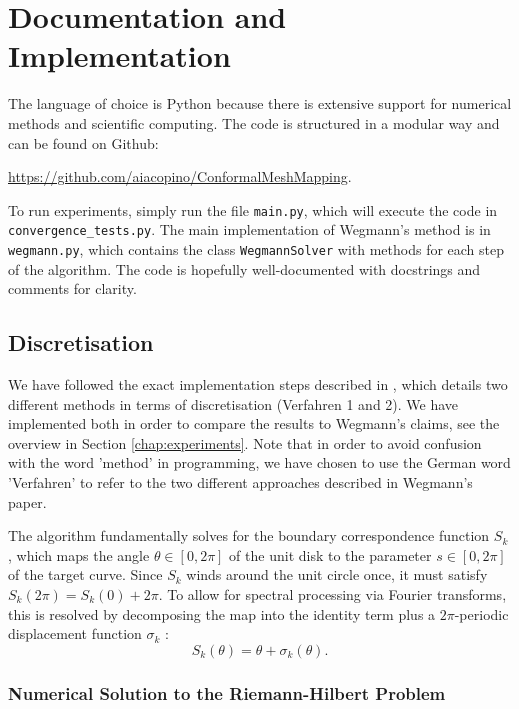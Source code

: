 \section{Documentation and Implementation} \label{chap:implementation}

The language of choice is Python because there is extensive support for numerical methods and scientific computing. The code is structured in a modular way and can be found on Github: 

\url{https://github.com/aiacopino/ConformalMeshMapping}.

To run experiments, simply run the file \texttt{main.py}, which will execute the code in \texttt{convergence\_tests.py}.
The main implementation of Wegmann's method is in \texttt{wegmann.py}, which contains the class \texttt{WegmannSolver} with methods for each step of the algorithm. The code is hopefully well-documented with docstrings and comments for clarity.

\subsection{Discretisation} \label{chap:WegmannImplementation}
We have followed the exact implementation steps described in \cite[§5]{Wegmann1978_newtonverfahren}, which details two different methods in terms of discretisation (Verfahren 1 and 2). We have implemented both in order to compare the results to Wegmann's claims, see the overview in Section \ref{chap:experiments}. 
Note that in order to avoid confusion with the word 'method' in programming, we have chosen to use the German word 'Verfahren' to refer to the two different approaches described in Wegmann's paper.

The algorithm fundamentally solves for the boundary correspondence function $S_k$, which maps the angle $\theta\in[0,2\pi]$ of the unit disk to the parameter $s\in[0,2\pi]$ of the target curve. Since $S_k$ winds around the unit circle once, it must satisfy $S_k(2\pi) = S_k(0) + 2\pi$. To allow for spectral processing via Fourier transforms, this is resolved by decomposing the map into the identity term plus a $2\pi$-periodic displacement function $\sigma_k$ \cite[Eq. 3.2]{Wegmann1984_convergence_iterative_method}:
\begin{equation}
    S_k(\theta) = \theta + \sigma_k(\theta).
\end{equation}

\subsubsection{Numerical Solution to the Riemann-Hilbert Problem}


